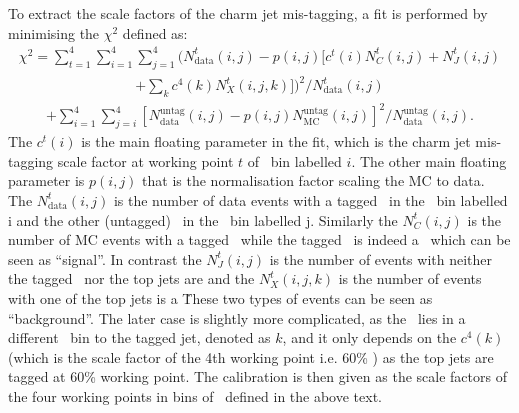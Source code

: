 To extract the scale factors of the charm jet mis-tagging, a fit is performed by minimising 
the $\chi^2$ defined as:
\begin{eqnarray*}
\chi^2 = \sum_{t=1}^4 \sum_{i=1}^4  \sum_{j=1}^4 (N^{t}_{\mathrm{data}}(i,j)- p(i,j) [c^{t}(i)N^{t}_{C}(i,j)+N^{t}_{J}(i,j)
\end{eqnarray*}
\begin{eqnarray*}
	+ \sum_k  c^{4}(k) N^{t}_{X}(i,j,k)])^2/N^{t}_{\mathrm{data}}(i,j)
\end{eqnarray*}
\begin{eqnarray}
 +  \sum_{i=1}^4 \sum_{j=i}^4 [N^{\mathrm{untag}}_{\mathrm{data}}(i,j)-p(i,j)N^{\mathrm{untag}}_{\mathrm{MC}}(i,j)]^2/N^{\mathrm{untag}}_{\mathrm{data}}(i,j).
\label{eqn:chi2}
\end{eqnarray}
The $c^{t}(i)$ is the main floating parameter in the fit, which is the charm jet 
mis-tagging scale factor at working point $t$ of \pt\ bin labelled $i$. 
The other main floating parameter is $p(i,j)$ that is the normalisation factor scaling the MC to
data. 
The $N^{t}_{\mathrm{data}}(i,j)$ is the number of data events with a tagged \wjet\ in the \pt\ bin labelled i
and the other (untagged) \wjet\ in the \pt\ bin labelled j. Similarly the $N^{t}_{C}(i,j)$ is the number of MC events 
with a tagged \wjet\, while the tagged \wjet\ is indeed a \cjet\, which can be seen as ``signal''. 
In contrast the $N^{t}_{J}(i,j)$ is the number of events with neither the tagged \wjet\ nor the top jets 
are \cjets\; and the $N^{t}_{X}(i,j,k)$ is the number of events with one of the top jets is a \cjet\. 
These two types of events can be seen as ``background''. The later case is slightly more complicated, as the 
\cjet\ lies in a different \pt\ bin to the tagged jet, denoted as $k$, and it only depends on the 
$c^4(k)$ (which is the scale factor of the 4th working point i.e. 60\% ) as the top jets
are tagged at 60\% working point. 
The calibration is then given as the scale factors of the four working points 
in bins of \pt\ defined in the above text. 


